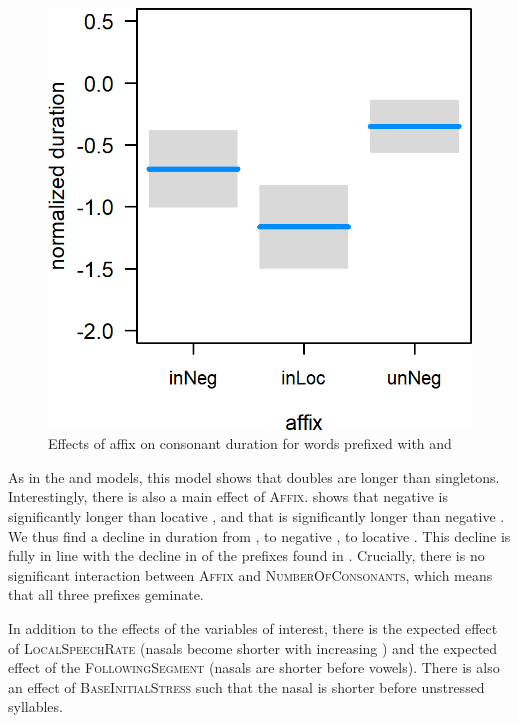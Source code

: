 \begin{figure}
	
	
	\includegraphics[scale=0.8] {images/Corpus/unInModel.png}
	\caption{Effects of  affix on consonant duration for words prefixed with  and }
	\label{fig:inUnModel}
\end{figure}



As in the  and models, this model shows that doubles are longer than singletons. Interestingly, there is also  a  main effect of \textsc{Affix}.  shows that negative  is significantly longer than locative , and that  is significantly longer than negative .  We thus find a decline in duration from , to negative , to locative . This decline is fully in line with the decline in  of the prefixes found in . Crucially, there is no significant interaction between \textsc{Affix} and \textsc{NumberOfConsonants}, which means that all three prefixes geminate.

In addition to the effects of the variables of interest, there is the expected effect of \textsc{LocalSpeechRate} (nasals become shorter with increasing ) and the expected effect of the \textsc{FollowingSegment} (nasals are shorter before vowels). There is also an effect of \textsc{BaseInitialStress} such that the nasal is shorter before unstressed syllables.

